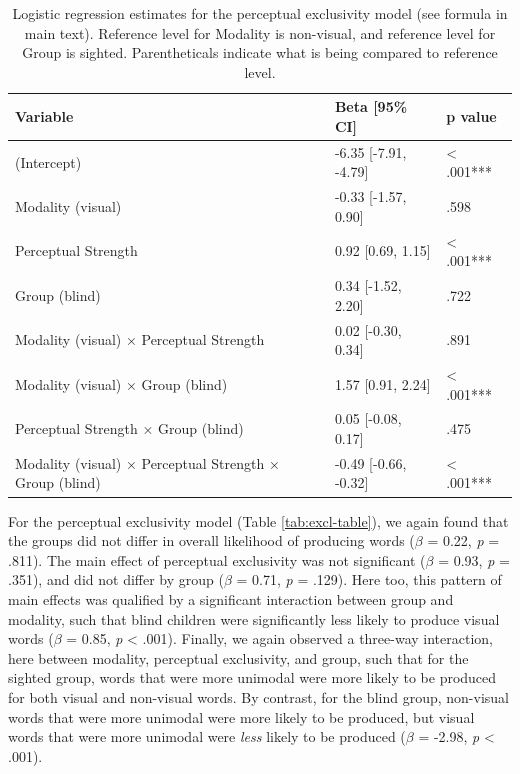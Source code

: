 \documentclass[
  man,floatsintext]{apa6}
\begin{document}
\begin{table}[H]

\caption{\label{tab:ps-table}Logistic regression estimates for the perceptual exclusivity model (see formula in main text). Reference level for Modality is non-visual, and reference level for Group is sighted. Parentheticals indicate what is being compared to reference level.}
\centering
\begin{tabular}[t]{l|l|l}
\hline
Variable & Beta [95\% CI] & p value\\
\hline
(Intercept) & -6.35 [-7.91, -4.79] & < .001***\\
\hline
Modality (visual) & -0.33 [-1.57, 0.90] & .598\\
\hline
Perceptual Strength & 0.92 [0.69, 1.15] & < .001***\\
\hline
Group (blind) & 0.34 [-1.52, 2.20] & .722\\
\hline
Modality (visual) × Perceptual Strength & 0.02 [-0.30, 0.34] & .891\\
\hline
Modality (visual) × Group (blind) & 1.57 [0.91, 2.24] & < .001***\\
\hline
Perceptual Strength × Group (blind) & 0.05 [-0.08, 0.17] & .475\\
\hline
Modality (visual) × Perceptual Strength × Group (blind) & -0.49 [-0.66, -0.32] & < .001***\\
\hline
\end{tabular}
\end{table}

For the perceptual exclusivity model (Table \ref{tab:excl-table}), we again found that the groups did not differ in overall likelihood of producing words (\(\beta\) = 0.22, \emph{p} = .811). The main effect of perceptual exclusivity was not significant (\(\beta\) = 0.93, \emph{p} = .351), and did not differ by group (\(\beta\) = 0.71, \emph{p} = .129). Here too, this pattern of main effects was qualified by a significant interaction between group and modality, such that blind children were significantly less likely to produce visual words (\(\beta\) = 0.85, \emph{p} \textless{} .001). Finally, we again observed a three-way interaction, here between modality, perceptual exclusivity, and group, such that for the sighted group, words that were more unimodal were more likely to be produced for both visual and non-visual words. By contrast, for the blind group, non-visual words that were more unimodal were more likely to be produced, but visual words that were more unimodal were \emph{less} likely to be produced (\(\beta\) = -2.98, \emph{p} \textless{} .001).
\end{document}
